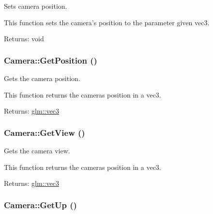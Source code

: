 Sets camera position. 

This function sets the camera's position to the parameter given vec3.

\begin{Desc}
\item[Returns:]void \end{Desc}
\hypertarget{class_camera_7166b8466c94d0b5c127fc74c7881beb}{
\subsubsection[GetPosition]{ Camera::GetPosition ()}}
\label{class_camera_7166b8466c94d0b5c127fc74c7881beb}


Gets the camera position. 

This function returns the cameras position in a vec3.

\begin{Desc}
\item[Returns:]\hyperlink{group__core__types_g1c47e8b3386109bc992b6c48e91b0be7}{glm::vec3} \end{Desc}
\hypertarget{class_camera_338c5baf20b57652828c53e0791adf9a}{
\subsubsection[GetView]{ Camera::GetView ()}}
\label{class_camera_338c5baf20b57652828c53e0791adf9a}


Gets the camera view. 

This function returns the cameras position in a vec3.

\begin{Desc}
\item[Returns:]\hyperlink{group__core__types_g1c47e8b3386109bc992b6c48e91b0be7}{glm::vec3} \end{Desc}
\hypertarget{class_camera_ff61f06284cca3216accdf556dfbd3c1}{
\subsubsection[GetUp]{ Camera::GetUp ()}}
\label{class_camera_ff61f06284cca3216accdf556dfbd3c1}


